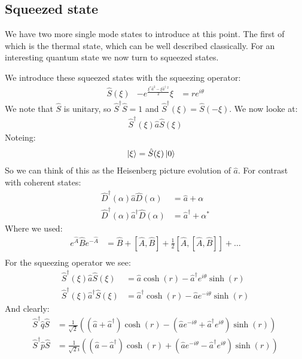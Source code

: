 \subsection{Squeezed state}
We have two more single mode states to introduce at this point. The first of which is the thermal state, which can be well described classically. For an interesting quantum state we now turn to squeezed states.

We introduce these squeezed states with the squeezing operator:
\begin{align*}
	\hat{S}(\xi) &- e^{\frac{\xi^*\hat{a}^2 - \xi\hat{a}^\dagger\ ^2}{2}}
	\xi &= r e^{i\theta}
\end{align*}
We note that $\hat{S}$ is unitary, so $\hat{S}^\dagger \hat{S} = 1$ and $\hat{S}^\dagger(\xi) = \hat{S}(-\xi)$. We now looke at:
\begin{align*}
	\hat{S}^\dagger(\xi) \hat{a}\hat{S}(\xi)
\end{align*}
Noteing:
\begin{align*}
	\ket{\xi} &= \hat{S}(\xi)\ket{0}
\end{align*}
So we can think of this as the Heisenberg picture evolution of $\hat{a}$. For contrast with coherent states:
\begin{align*}
	\hat{D}^\dagger(\alpha)\hat{a}\hat{D}(\alpha) &=\hat{a} + \alpha \\
	\hat{D}^\dagger(\alpha)\hat{a}^\dagger\hat{D}(\alpha) &=\hat{a}^\dagger + \alpha^*
\end{align*}
Where we used:
\begin{align*}
	e^{\hat{A}} \hat{B} e^{-\hat{A}} &= \hat{B} +  [\hat{A},\hat{B}] + \frac{1}{2} [\hat{A},[\hat{A},\hat{B}]] + \ldots \\
\end{align*}
For the squeezing operator we see:
\begin{align*}
	\hat{S}^\dagger(\xi)\hat{a}\hat{S}(\xi) &= \hat{a}\cosh(r)  - \hat{a}^\dagger e^{i\theta} \sinh(r) \\
	\hat{S}^\dagger(\xi)\hat{a}^\dagger\hat{S}(\xi) &= \hat{a}^\dagger\cosh(r)  - \hat{a} e^{-i\theta} \sinh(r)
\end{align*}
And clearly:
\begin{align*}
	\hat{S}^\dagger \hat{q}\hat{S} &= \frac{1}{\sqrt{2}}\left( (\hat{a} + \hat{a}^\dagger) \cosh(r) - (\hat{a} e^{-i\theta} + \hat{a}^\dagger e^{i\theta})\sinh(r)\right) \\
	\hat{S}^\dagger \hat{p}\hat{S} &= \frac{1}{\sqrt{2}i}\left( (\hat{a} - \hat{a}^\dagger) \cosh(r) + (\hat{a} e^{-i\theta} - \hat{a}^\dagger e^{i\theta})\sinh(r)\right)
\end{align*}
